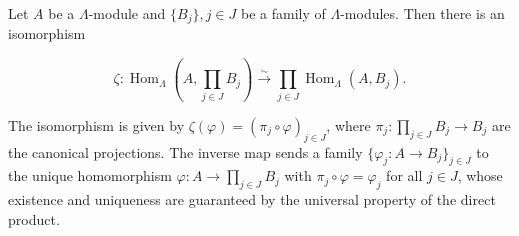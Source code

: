 Let $A$ be a $\Lambda$-module and $\{B_j\}, j \in J$ be a family of $\Lambda$-modules. Then there is an isomorphism

$$\zeta : \operatorname{Hom}_{\Lambda}\left( A, \prod_{j \in J} B_j \right) \xrightarrow{\sim} \prod_{j \in J} \operatorname{Hom}_{\Lambda}(A, B_j).$$

The isomorphism is given by $\zeta(\varphi) = (\pi_j \circ \varphi)_{j \in J}$, where $\pi_j : \prod_{j \in J} B_j \rightarrow B_j$ are the canonical projections. The inverse map sends a family $\{\varphi_j : A \rightarrow B_j\}_{j \in J}$ to the unique homomorphism $\varphi : A \rightarrow \prod_{j \in J} B_j$ with $\pi_j \circ \varphi = \varphi_j$ for all $j \in J$, whose existence and uniqueness are guaranteed by the universal property of the direct product.
